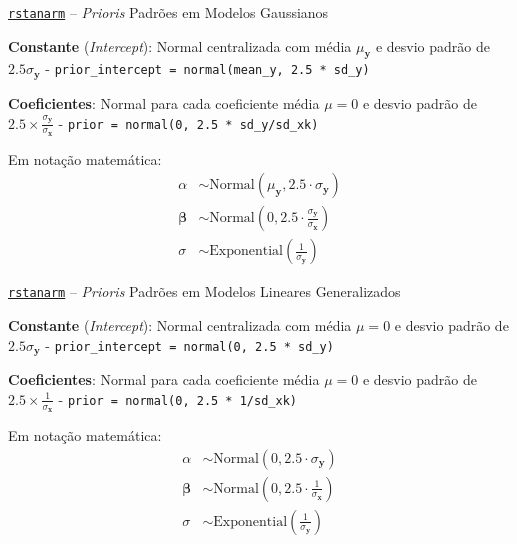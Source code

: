 \begin{frame}{\href{http://mc-stan.org/rstanarm/}{\texttt{rstanarm}} -- \textit{Prioris} Padrões em Modelos Gaussianos}
    \begin{vfilleditems}
        \item \textbf{Constante} (\textit{Intercept}): Normal centralizada com média $\mu_{\boldsymbol{y}}$ e desvio padrão de $2.5 \sigma_{\boldsymbol{y}}$ - \lstinline!prior_intercept = normal(mean_y, 2.5 * sd_y)!
        \item \textbf{Coeficientes}: Normal para cada coeficiente média $\mu = 0$ e desvio padrão de $2.5\times\frac{\sigma_{\boldsymbol{y}}}{\sigma_{\boldsymbol{x}}}$ - \lstinline!prior = normal(0, 2.5 * sd_y/sd_xk)!
    \end{vfilleditems}
Em notação matemática:
$$
\begin{aligned}
\alpha &\sim \text{Normal}(\mu_{\boldsymbol{y}}, 2.5 \cdot \sigma_{\boldsymbol{y}})\\
\boldsymbol{\beta} &\sim \text{Normal}\left( 0, 2.5 \cdot \frac{\sigma_{\boldsymbol{y}}}{\sigma_{\boldsymbol{x}}} \right) \\
\sigma &\sim \text{Exponential}\left( \frac{1}{\sigma_{\boldsymbol{y}}} \right)
\end{aligned}
$$
\end{frame}

\begin{frame}{\href{http://mc-stan.org/rstanarm/}{\texttt{rstanarm}} -- \textit{Prioris} Padrões em Modelos Lineares Generalizados}
    \begin{vfilleditems}
        \item \textbf{Constante} (\textit{Intercept}): Normal centralizada com média $\mu = 0$ e desvio padrão de $2.5 \sigma_{\boldsymbol{y}}$ - \lstinline!prior_intercept = normal(0, 2.5 * sd_y)!
        \item \textbf{Coeficientes}: Normal para cada coeficiente média $\mu = 0$ e desvio padrão de $2.5\times\frac{1}{\sigma_{\boldsymbol{x}}}$ - \lstinline!prior = normal(0, 2.5 * 1/sd_xk)!
    \end{vfilleditems}
Em notação matemática:
$$
\begin{aligned}
\alpha &\sim \text{Normal}(0, 2.5 \cdot \sigma_{\boldsymbol{y}})\\
\boldsymbol{\beta} &\sim \text{Normal}\left( 0, 2.5 \cdot \frac{1}{\sigma_{\boldsymbol{x}}} \right) \\
\sigma &\sim \text{Exponential}\left( \frac{1}{\sigma_{\boldsymbol{y}}} \right)
\end{aligned}
$$
\end{frame}

